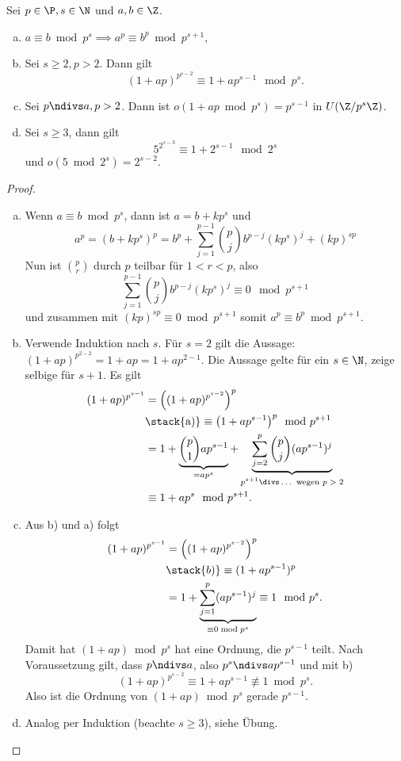 \begin{lem} \label{2.7}
	Sei $p \in \P, s \in \N$ und $a, b \in \Z$.
	\begin{enumerate}[a)]
		\item
			$a \equiv b \bmod p^s \implies a^p \equiv b^p \bmod p^{s+1}$,
		\item
			Sei $s \ge 2, p > 2$.
			Dann gilt
			\[
				(1 + ap)^{p^{s-2}}
				\equiv 1 + ap^{s-1} \mod p^s.
			\]
		\item
			Sei $p \ndivs a, p > 2$.
			Dann ist $o(1 + ap \bmod p^s) = p^{s-1}$ in $U(\Z / p^s \Z)$.
		\item
			Sei $s \ge 3$, dann gilt
			\[
				5^{2^{s-3}} \equiv 1 + 2^{s-1} \mod 2^s
			\]
			und $o(5 \bmod 2^s) = 2^{s-2}$.
	\end{enumerate}
	\begin{proof}
		\begin{enumerate}[a)]
			\item
				Wenn $a \equiv b \bmod p^s$, dann ist $a = b + k p^s$ und
				\[
					a^p
					= (b + kp^s)^p
					= b^p + \sum_{j=1}^{p-1} \binom{p}{j} b^{p-j} (kp^s)^j + (kp)^{sp}
				\]
				Nun ist $\binom{p}{r}$ durch $p$ teilbar für $1 < r < p$, also
				\[
					\sum_{j=1}^{p-1} \binom{p}{j} b^{p-j} (kp^s)^j \equiv 0 \mod p^{s+1}
				\]
				und zusammen mit $(kp)^{sp} \equiv 0 \bmod p^{s+1}$ somit $a^p \equiv b^p \bmod p^{s+1}$.
			\item
{}
				Verwende Induktion nach $s$.
				Für $s = 2$ gilt die Aussage: $(1 + ap)^{p^{2-2}} = 1 + ap = 1 + ap^{2-1}$.
				Die Aussage gelte für ein $s \in \N$, zeige selbige für $s + 1$.
				Es gilt
				\begin{align*}
					(1 + ap)^{p^{s-1}}
					&= \Big((1 + ap)^{p^{s-2}}\Big)^p \\
					&\stack{\text{a)}}\equiv \big(1 + ap^{s-1} \big)^p \mod p^{s+1} \\
					&= 1 + \underbrace{\binom{p}{1} ap^{s-1}}_{= ap^s} + \underbrace{\sum_{j=2}^p \binom{p}{j} (ap^{s-1})^j}_{\text{$p^{s+1} \divs \dotsc$ wegen $p > 2$}} \\
					&\equiv 1 + ap^s \mod p^{s+1}.
				\end{align*}
			\item
				Aus b) und a) folgt
				\begin{align*}
					(1 + ap)^{p^{s-1}}
					&= \Big( (1+ap)^{p^{s-2}} \Big)^p \\
					&\stack{b)}\equiv (1 + ap^{s-1})^p \\
					&= 1 + \underbrace{\sum_{j=1}^p (ap^{s-1})^j}_{\equiv 0 \bmod p^s}
					\equiv 1 \mod p^s.
				\end{align*}
				Damit hat $(1 + ap) \bmod p^s$ hat eine Ordnung, die $p^{s-1}$ teilt.
				Nach Voraussetzung gilt, dass $p \ndivs a$, also $p^s \ndivs ap^{s-1}$ und mit b)
				\[
					(1 + ap)^{p^{s-2}} \equiv 1 + ap^{s-1} \not\equiv 1 \bmod p^s.
				\]
				Also ist die Ordnung von $(1 + ap) \bmod p^s$ gerade $p^{s-1}$.
			\item
				Analog per Induktion (beachte $s \ge 3$), siehe Übung.
				\Exercise
		\end{enumerate}
	\end{proof}
\end{lem}


